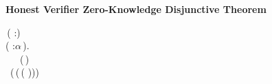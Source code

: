 \textbf{Honest Verifier Zero-Knowledge Disjunctive Theorem}
\begin{holmath}
    \,( :)\,\HOLSymConst{\HOLTokenImp{}}\\
\HOLSymConst{\HOLTokenForall{}}( :\ensuremath{\alpha}\,).\\
\,\,\,\,\HOLSymConst{\HOLTokenConj{}}\,\,\,\HOLSymConst{\HOLTokenConj{}}\,\,(\,)\,\HOLSymConst{=}\,\,\HOLSymConst{\HOLTokenImp{}}\\
\,\,\,(\,(\,(\,\,)))
\end{holmath}  
\newpage
